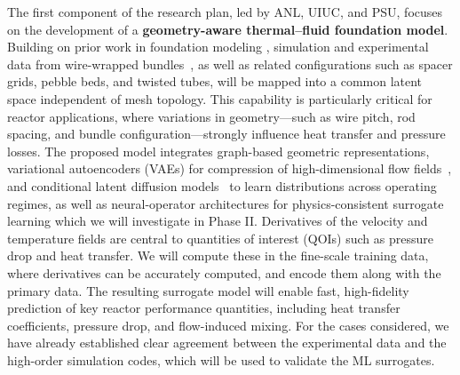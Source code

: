 The first component of the research plan, led by ANL, UIUC, and PSU, focuses on
the development of a {\bf geometry-aware thermal–fluid foundation model}.
Building on prior work in foundation modeling \cite{Vishwasrao2026AgenticPDE},
simulation and experimental data from wire-wrapped
bundles~\cite{Dai2025WireWrapped61Pin,kaeri37pin}, as well as related
configurations such as spacer grids, pebble beds, and twisted tubes, will be
mapped into {\rm a common latent space independent of mesh topology}. This
capability is particularly critical for reactor applications, where variations
in geometry—such as wire pitch, rod spacing, and bundle configuration—strongly
influence heat transfer and pressure losses.  The proposed model integrates
{\rm graph-based geometric representations}, {\rm variational autoencoders
(VAEs)} for compression of high-dimensional flow
fields~\cite{Vinuesa2022MLCFD,SoleraRico2024BetaVAE}, and {\rm conditional
latent diffusion models}~\cite{Vishwasrao2025DiffSPORT} to learn distributions
across operating regimes, as well as neural-operator architectures for
physics-consistent surrogate learning which we will investigate in Phase II.
Derivatives of the velocity and temperature fields are central to quantities of
interest (QOIs) such as pressure drop and heat transfer.  We will compute these
in the fine-scale training data, where derivatives can be accurately computed,
and encode them along with the primary data.  The resulting surrogate model
will enable fast, high-fidelity prediction of key reactor performance
quantities, including heat transfer coefficients, pressure drop, and
flow-induced mixing. For the cases considered, we have already established
clear agreement between the experimental data and the high-order simulation
codes, which will be used to validate the ML surrogates.

